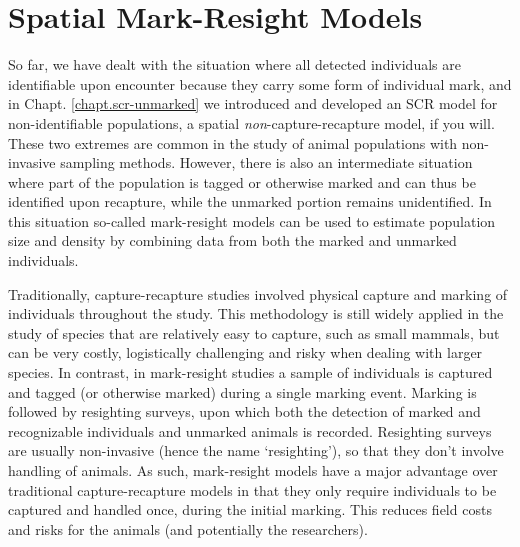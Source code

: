 \chapter{
Spatial Mark-Resight Models
}

\label{chapt.partialID}

\vspace{.3in}


So far, %
we have dealt with the situation where all detected
individuals are
identifiable
upon encounter because they carry some form of individual mark,
and in Chapt. \ref{chapt.scr-unmarked} %
we introduced and developed an SCR model for
non-identifiable populations, a spatial {\it non}-capture-recapture
model, if you will.
These
two extremes are common in the study of animal populations with
non-invasive sampling methods. However, there is also an intermediate
situation where
part of the population is tagged or otherwise
marked and can thus be identified upon recapture, while the unmarked
portion remains unidentified. %
In this situation so-called mark-resight
models \citep{bartmann_etal:1987, arnason_etal:1991, neal_etal:1993}
can be used to estimate population size and density
by %
combining data
from both the marked and unmarked individuals.

Traditionally,
capture-recapture studies involved physical capture and marking of
individuals throughout the study. %
This methodology is still widely applied in the
study of species that are relatively easy to capture, such as small
mammals, but can be very costly, logistically challenging and risky
when dealing with larger species. In contrast, in mark-resight studies
a sample of individuals is captured and tagged (or otherwise marked)
during a single marking event. Marking is followed by resighting
surveys, upon which both the detection of marked and recognizable
individuals and unmarked animals is recorded. Resighting surveys are
usually non-invasive (hence the name `resighting'), so that they
don't involve handling of animals. As such, mark-resight models have a
major advantage over traditional capture-recapture models in that they
only require individuals to be captured and handled once, during the
initial marking. This reduces field costs and risks for the animals
(and potentially the researchers).


